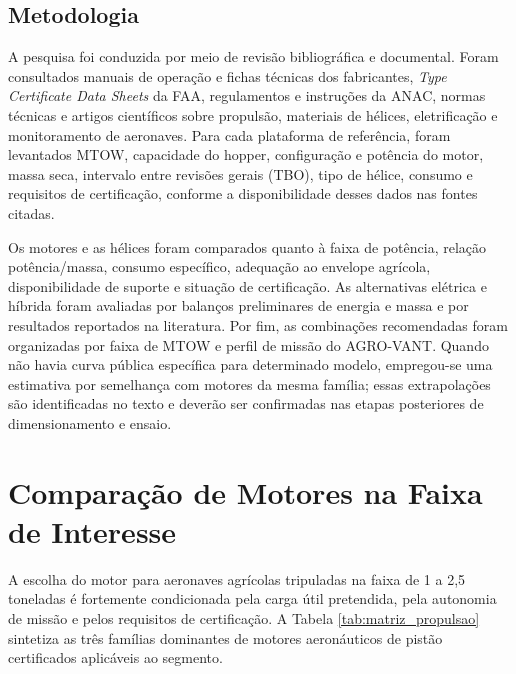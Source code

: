 \documentclass[a4paper,12pt]{article}
\begin{document}
\subsection{Metodologia}

A pesquisa foi conduzida por meio de revisão bibliográfica e documental. Foram consultados manuais de operação e fichas técnicas dos fabricantes, \textit{Type Certificate Data Sheets} da FAA, regulamentos e instruções da ANAC, normas técnicas e artigos científicos sobre propulsão, materiais de hélices, eletrificação e monitoramento de aeronaves. Para cada plataforma de referência, foram levantados MTOW, capacidade do hopper, configuração e potência do motor, massa seca, intervalo entre revisões gerais (TBO), tipo de hélice, consumo e requisitos de certificação, conforme a disponibilidade desses dados nas fontes citadas.

Os motores e as hélices foram comparados quanto à faixa de potência, relação potência/massa, consumo específico, adequação ao envelope agrícola, disponibilidade de suporte e situação de certificação. As alternativas elétrica e híbrida foram avaliadas por balanços preliminares de energia e massa e por resultados reportados na literatura. Por fim, as combinações recomendadas foram organizadas por faixa de MTOW e perfil de missão do AGRO-VANT. Quando não havia curva pública específica para determinado modelo, empregou-se uma estimativa por semelhança com motores da mesma família; essas extrapolações são identificadas no texto e deverão ser confirmadas nas etapas posteriores de dimensionamento e ensaio.

\section{Comparação de Motores na Faixa de Interesse}

A escolha do motor para aeronaves agrícolas tripuladas na faixa de 1 a 2{,}5 toneladas é fortemente condicionada pela carga útil pretendida, pela autonomia de missão e pelos requisitos de certificação. A Tabela \ref{tab:matriz_propulsao} sintetiza as três famílias dominantes de motores aeronáuticos de pistão certificados aplicáveis ao segmento.
\end{document}
